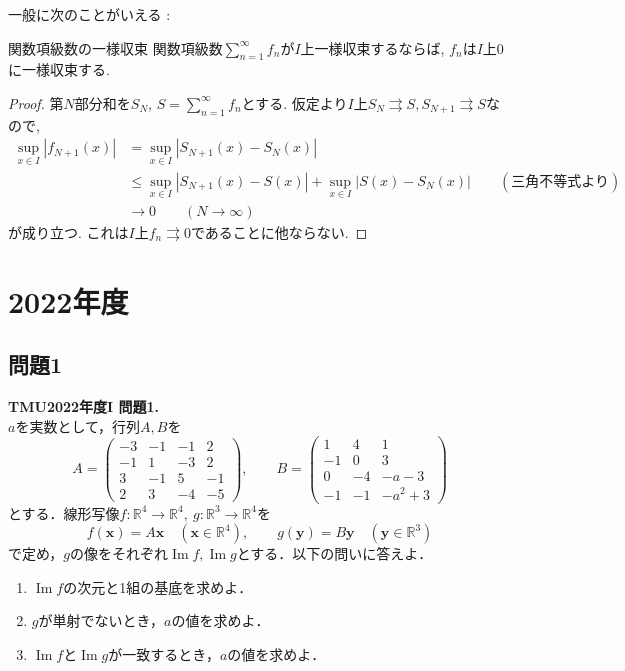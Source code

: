 \documentclass[titlepage]{jsarticle}
\numberwithin{equation}{section}
\renewcommand{\Im}{\operatorname{Im}}
\begin{document}
一般に次のことがいえる : 
\begin{thm}{関数項級数の一様収束}{}
関数項級数$\displaystyle{\sum_{n=1}^\infty f_n}$が$I$上一様収束するならば, $f_n$は$I$上$0$に一様収束する.
\end{thm}
\begin{proof}
第$N$部分和を$S_N$, $S = \displaystyle{\sum_{n=1}^\infty f_n}$とする. 仮定より$I$上$S_{N} \rightrightarrows S, S_{N+1} \rightrightarrows S$なので, 
\begin{align*}
\sup_{x \in I}|f_{N+1}(x)| &=\sup_{x\in I}|S_{N+1}(x) - S_{N}(x)|\\ &\le \sup_{x \in I}|S_{N+1}(x) - S(x)| + \sup_{x \in I}|S(x) - S_N(x)|\qquad(\text{三角不等式より})\\
&\to 0\qquad(N \to \infty)
\end{align*}
が成り立つ. これは$I$上$f_n \rightrightarrows 0$であることに他ならない.
\end{proof}
\section{2022年度}
\subsection{問題1}
\begin{problem}
\textbf{TMU2022年度I 問題1.}\\
$a$を実数として，行列$A, B$を
\[
A=
\begin{pmatrix}
-3 & -1 & -1 & 2 \\
-1 & 1 & -3 & 2 \\
3 & -1 & 5 & -1 \\
2 & 3 & -4 & -5
\end{pmatrix},
\qquad
B=
\begin{pmatrix}
1 & 4 & 1 \\
-1 & 0 & 3 \\
0 & -4 & -a-3 \\
-1 & -1 & -a^2+3
\end{pmatrix}
\]
とする．線形写像$f:\mathbb{R}^4 \to \mathbb{R}^4,\ g:\mathbb{R}^3 \to \mathbb{R}^4$を
\[
f(\bm{x})=A\bm{x}\quad (\bm{x}\in\mathbb{R}^4),
\qquad
g(\bm{y})=B\bm{y}\quad (\bm{y}\in\mathbb{R}^3)
\]
で定め，$g$の像をそれぞれ$\Im f,\Im g$とする．以下の問いに答えよ．

\begin{enumerate}[label=(\arabic*)]
\item $\Im f$の次元と1組の基底を求めよ．
\item $g$が単射でないとき，$a$の値を求めよ．
\item $\Im f$と$\Im g$が一致するとき，$a$の値を求めよ．
\end{enumerate}
\end{problem}
\end{document}
